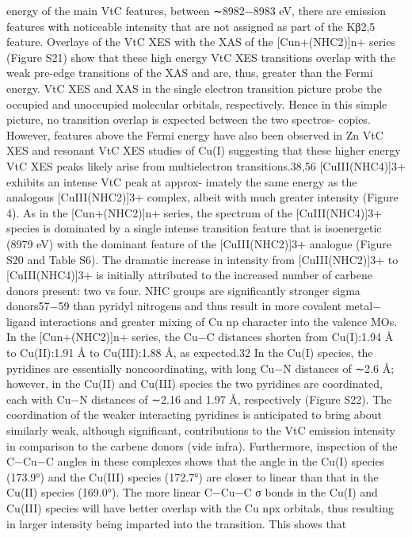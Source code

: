 \documentclass{article}
\begin{document}
energy of the main VtC features, between ∼8982−8983 eV,
there are emission features with noticeable intensity that are
not assigned as part of the Kβ2,5 feature. Overlays of the VtC
XES with the XAS of the [Cun+(NHC2)]n+ series (Figure S21)
show that these high energy VtC XES transitions overlap with
the weak pre-edge transitions of the XAS and are, thus, greater
than the Fermi energy. VtC XES and XAS in the single
electron transition picture probe the occupied and unoccupied
molecular orbitals, respectively. Hence in this simple picture,
no transition overlap is expected between the two spectros-
copies. However, features above the Fermi energy have also
been observed in Zn VtC XES and resonant VtC XES studies
of Cu(I) suggesting that these higher energy VtC XES peaks
likely arise from multielectron transitions.38,56
[CuIII(NHC4)]3+ exhibits an intense VtC peak at approx-
imately the same energy as the analogous [CuIII(NHC2)]3+
complex, albeit with much greater intensity (Figure 4). As in
the
[Cun+(NHC2)]n+
series,
the
spectrum
of
the
[CuIII(NHC4)]3+ species is dominated by a single intense
transition feature that is isoenergetic (8979 eV) with the
dominant feature of the [CuIII(NHC2)]3+ analogue (Figure
S20 and Table S6). The dramatic increase in intensity from
[CuIII(NHC2)]3+ to [CuIII(NHC4)]3+ is initially attributed to
the increased number of carbene donors present: two vs four.
NHC groups are signiﬁcantly stronger sigma donors57−59 than
pyridyl nitrogens and thus result in more covalent metal−
ligand interactions and greater mixing of Cu np character into
the valence MOs.
In the [Cun+(NHC2)]n+ series, the Cu−C distances shorten
from Cu(I):1.94 Å to Cu(II):1.91 Å to Cu(III):1.88 Å, as
expected.32 In the Cu(I) species, the pyridines are essentially
noncoordinating, with long Cu−N distances of ∼2.6 Å;
however, in the Cu(II) and Cu(III) species the two pyridines
are coordinated, each with Cu−N distances of ∼2.16 and 1.97
Å, respectively (Figure S22). The coordination of the weaker
interacting pyridines is anticipated to bring about similarly
weak, although signiﬁcant, contributions to the VtC emission
intensity in comparison to the carbene donors (vide infra).
Furthermore, inspection of the C−Cu−C angles in these
complexes shows that the angle in the Cu(I) species (173.9°)
and the Cu(III) species (172.7°) are closer to linear than that
in the Cu(II) species (169.0°). The more linear C−Cu−C σ
bonds in the Cu(I) and Cu(III) species will have better
overlap with the Cu npx orbitals, thus resulting in larger
intensity being imparted into the transition. This shows that
\end{document}

